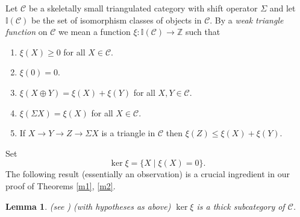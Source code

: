 \documentclass{amsart}
\newcommand{\I}{\mathbb{I} }
\newcommand{\C}{\mathcal{C} }
\newcommand{\Z}{\mathbb{Z} }
\newcommand{\rt}{\rightarrow}
\theoremstyle{plain}
\newtheorem{lemma}[theorem]{Lemma}
\theoremstyle{definition}
\theoremstyle{remark}
\begin{document}
\s \label{t-f} Let $\C$ be a skeletally  small triangulated category  with shift operator $\Sigma$ and let $\I(\C)$ be the set of isomorphism classes of objects in $\C$. By a \emph{weak triangle function} on $\C$ we mean a function $\xi \colon \I(\C) \rt \Z$ such that
\begin{enumerate}
  \item $\xi(X) \geq 0$ for all $X \in \C$.
  \item $\xi(0) = 0$.
  \item $\xi(X \oplus Y) = \xi(X) + \xi(Y)$ for all $X, Y \in \C$.
  \item $\xi(\Sigma X ) = \xi(X)$ for all $X \in \C$.
  \item If $X \rt Y \rt Z \rt \Sigma X $ is a triangle in $\C$ then
   $\xi(Z) \leq \xi(X) + \xi(Y)$.
\end{enumerate}
\s Set $$\ker \xi = \{ X \mid \xi(X) = 0 \}.$$
The following result (essentially an observation) is a crucial ingredient in our proof of Theorems \ref{m1}, \ref{m2}.
\begin{lemma}(see \cite[2.3]{P4} )
\label{ker-lemma}(with hypotheses as above)
$\ker \xi $ is a thick subcategory of $\C$.
\end{lemma}
\end{document}
